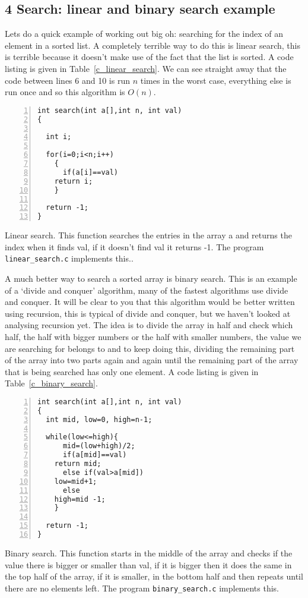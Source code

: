 \documentclass[11pt,a4paper]{scrartcl}
\begin{document}
\subsection*{4 Search: linear and binary search example}

Lets do a quick example of working out big oh: searching for the index
of an element in a sorted list. A completely terrible way to do this
is linear search, this is terrible because it doesn't make use of the
fact that the list is sorted. A code listing is given in
Table~\ref{c_linear_search}. We can see straight away that the code
between lines 6 and 10 is run $n$ times in the worst case, everything
else is run once and so this algorithm is $O(n)$.

\begin{table}
\begin{lstlisting}[numbers=left]
int search(int a[],int n, int val)
{

  int i;

  for(i=0;i<n;i++)
    {
      if(a[i]==val)
	return i;
    }

  return -1;
}
\end{lstlisting}
\caption{Linear search. This function searches the entries in the array a and returns the index when it finds val, if it doesn't find val it returns -1. The program {\tt linear\_search.c} implements this.\label{c_linear_search}.}
\end{table}

A much better way to search a sorted array is binary search. This is
an example of a \lq{}divide and conquer\rq{} algorithm, many of the
fastest algorithms use divide and conquer. It will be clear to you
that this algorithm would be better written using recursion, this is
typical of divide and conquer, but we haven't looked at analysing
recursion yet. The idea is to divide the array in half and check which
half, the half with bigger numbers or the half with smaller numbers,
the value we are searching for belongs to and to keep doing this,
dividing the remaining part of the array into two parts again and again
until the remaining part of the array that is being searched has only
one element. A code listing is given in Table~\ref{c_binary_search}.

\begin{table}
\begin{lstlisting}[numbers=left] 
int search(int a[],int n, int val)
{
  int mid, low=0, high=n-1;

  while(low<=high){
      mid=(low+high)/2;
      if(a[mid]==val)
	return mid;
      else if(val>a[mid])
	low=mid+1;
      else
	high=mid -1;
    }

  return -1;
}
\end{lstlisting}
\caption{Binary search. This function starts in the middle of the array
  and checks if the value there is bigger or smaller than val, if it
  is bigger then it does the same in the top half of the array, if it
  is smaller, in the bottom half and then repeats until there are no
  elements left. The program {\tt binary\_search.c} implements
  this.\label{c_binary_search}}
\end{table}
\end{document}
